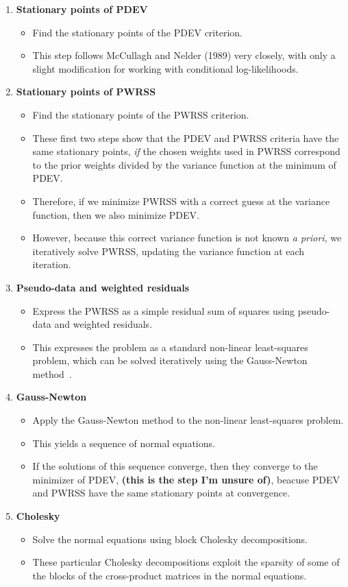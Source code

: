 \documentclass{jss}
\begin{document}
\begin{enumerate}
\item \textbf{Stationary points of PDEV}
  \begin{itemize}
    \item Find the stationary points of the PDEV criterion.
    \item This step follows McCullagh and Nelder (1989) very closely,
      with only a slight modification for working with conditional
      log-likelihoods.
  \end{itemize}
\item \textbf{Stationary points of PWRSS}
  \begin{itemize}
  \item Find the stationary points of the PWRSS criterion.
    \item These first two steps show that the PDEV and PWRSS criteria
      have the same stationary points, \emph{if} the chosen weights
      used in PWRSS correspond to the prior weights divided by the
      variance function at the minimum of PDEV.
    \item Therefore, if we minimize PWRSS with a correct guess at the
      variance function, then we also minimize PDEV.
    \item However, because this correct variance function is not known
      \emph{a priori}, we iteratively solve PWRSS, updating the
      variance function at each iteration.
  \end{itemize}
\item \textbf{Pseudo-data and weighted residuals}
  \begin{itemize}
  \item Express the PWRSS as a simple residual sum of squares using
    pseudo-data and weighted residuals.
  \item This expresses the problem as a standard non-linear
    least-squares problem, which can be solved iteratively using the
    Gauss-Newton method~\citep[\S2.2.3]{bateswatts88:_nonlin}.
  \end{itemize}
\item \textbf{Gauss-Newton}
  \begin{itemize}
  \item Apply the Gauss-Newton method to the non-linear least-squares
    problem.
  \item This yields a sequence of normal equations.
  \item If the solutions of this sequence converge, then they converge
    to the minimizer of PDEV, \textbf{(this is the step I'm unsure
      of)}, beacuse PDEV and PWRSS have the same stationary points at
    convergence.
  \end{itemize}
\item \textbf{Cholesky}
  \begin{itemize}
  \item Solve the normal equations using block Cholesky
    decompositions.
  \item These particular Cholesky decompositions exploit the sparsity
    of some of the blocks of the cross-product matrices in the normal
    equations.
  \end{itemize}
\end{enumerate}
\end{document}
